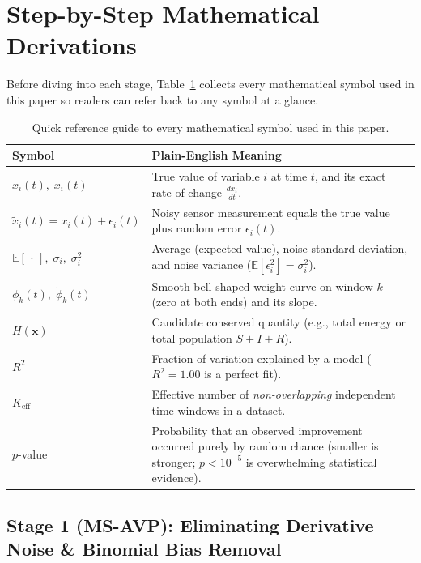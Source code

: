 \documentclass[11pt,a4paper]{article}
\begin{document}
\section{Step-by-Step Mathematical Derivations}
Before diving into each stage, Table~\ref{tab:notation} collects every mathematical symbol used in this paper so readers can refer back to any symbol at a glance.

\begin{table}[!htbp]
\centering
\caption{Quick reference guide to every mathematical symbol used in this paper.}
\label{tab:notation}
\small
\begin{tabular}{@{}>{\raggedright\arraybackslash}p{} >{\raggedright\arraybackslash}p{}@{}}
\toprule
\textbf{Symbol} & \textbf{Plain-English Meaning} \\
\midrule
$x_i(t),\; \dot{x}_i(t)$ & True value of variable $i$ at time $t$, and its exact rate of change $\frac{dx_i}{dt}$. \\
$\tilde{x}_i(t) = x_i(t) + \epsilon_i(t)$ & Noisy sensor measurement equals the true value plus random error $\epsilon_i(t)$. \\
$\mathbb{E}[\,\cdot\,],\; \sigma_i,\; \sigma_i^2$ & Average (expected value), noise standard deviation, and noise variance ($\mathbb{E}[\epsilon_i^2] = \sigma_i^2$). \\
$\phi_k(t),\; \dot{\phi}_k(t)$ & Smooth bell-shaped weight curve on window $k$ (zero at both ends) and its slope. \\
$H(\mathbf{x})$ & Candidate conserved quantity (e.g., total energy or total population $S+I+R$). \\
$R^2$ & Fraction of variation explained by a model ($R^2 = 1.00$ is a perfect fit). \\
$K_{\text{eff}}$ & Effective number of \emph{non-overlapping} independent time windows in a dataset. \\
$p$-value & Probability that an observed improvement occurred purely by random chance (smaller is stronger; $p < 10^{-5}$ is overwhelming statistical evidence). \\
\bottomrule
\end{tabular}
\end{table}

\subsection{Stage 1 (MS-AVP): Eliminating Derivative Noise \& Binomial Bias Removal}
\end{document}
